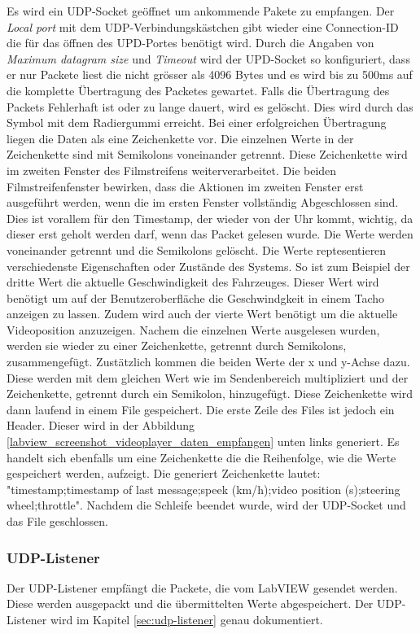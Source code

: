 Es wird ein UDP-Socket geöffnet um ankommende Pakete zu empfangen. Der \textit{Local port} mit dem UDP-Verbindungskästchen gibt wieder eine Connection-ID die für das öffnen des UPD-Portes benötigt wird. Durch die Angaben von \textit{Maximum datagram size} und \textit{Timeout} wird der UPD-Socket so konfiguriert, dass er nur Packete liest die nicht grösser als 4096 Bytes und es wird bis zu 500ms auf die komplette Übertragung des Packetes gewartet. Falls die Übertragung des Packets Fehlerhaft ist oder zu lange dauert, wird es gelöscht. Dies wird durch das Symbol mit dem Radiergummi erreicht. Bei einer erfolgreichen Übertragung liegen die Daten als eine Zeichenkette vor. Die einzelnen Werte in der Zeichenkette sind mit Semikolons voneinander getrennt. Diese Zeichenkette wird im zweiten Fenster des Filmstreifens weiterverarbeitet. Die beiden Filmstreifenfenster bewirken, dass die Aktionen im zweiten Fenster erst ausgeführt werden, wenn die im ersten Fenster vollständig Abgeschlossen sind. Dies ist vorallem für den Timestamp, der wieder von der Uhr kommt, wichtig, da dieser erst geholt werden darf, wenn das Packet gelesen wurde. Die Werte werden voneinander getrennt und die Semikolons gelöscht. Die Werte reptesentieren verschiedenste Eigenschaften oder Zustände des Systems. So ist zum Beispiel der dritte Wert die aktuelle Geschwindigkeit des Fahrzeuges. Dieser Wert wird benötigt um auf der Benutzeroberfläche die Geschwindgkeit in einem Tacho anzeigen zu lassen. Zudem wird auch der vierte Wert benötigt um die aktuelle Videoposition anzuzeigen. Nachem die einzelnen Werte ausgelesen wurden, werden sie wieder zu einer Zeichenkette, getrennt durch Semikolons, zusammengefügt. Zustätzlich kommen die beiden Werte der x und y-Achse dazu. Diese werden mit dem gleichen Wert wie im Sendenbereich multipliziert und der Zeichenkette, getrennt durch ein Semikolon, hinzugefügt.  Diese Zeichenkette wird dann laufend in einem File gespeichert. Die erste Zeile des Files ist jedoch ein Header. Dieser wird in der Abbildung \ref{labview_screenshot_videoplayer_daten_empfangen} unten links generiert. Es handelt sich ebenfalls um eine Zeichenkette die die Reihenfolge, wie die Werte gespeichert werden, aufzeigt. Die generiert Zeichenkette lautet: "timestamp;timestamp of last message;speek (km/h);video position (s);steering wheel;throttle". Nachdem die Schleife beendet wurde, wird der UDP-Socket und das File geschlossen.

\subsubsection{UDP-Listener}
Der UDP-Listener empfängt die Packete, die vom LabVIEW gesendet werden. Diese werden ausgepackt und die übermittelten Werte abgespeichert. Der UDP-Listener wird im Kapitel \ref{sec:udp-listener} genau dokumentiert. 
